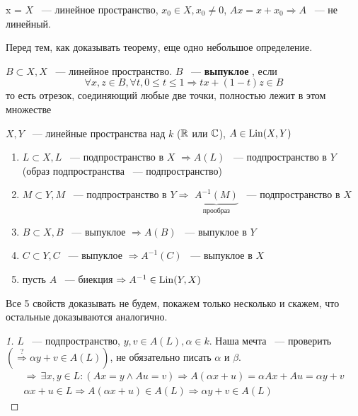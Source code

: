 \documentclass[document]{subfiles}
\begin{document}
\begin{example}x =
    $X$ ~--- линейное пространство, $x_0 \in X, x_0 \ne 0$, $Ax = x + x_0 \Rightarrow A$ ~--- не линейный.
\end{example}
 
Перед тем, как доказывать теорему, еще одно небольшое определение.
\begin{definition}
    $B \subset X, X$ ~--- линейное пространство. $B$ ~--- \textbf{ выпуклое }, если 
    \[ \forall x,z \in B, \forall t, 0 \leq t \leq 1 \Rightarrow tx + (1-t)z \in B \]
    то есть отрезок, соединяющий любые две точки, полностью лежит в этом множестве
\end{definition}
 
\begin{theorem}
    $X,Y$ ~--- линейные пространства над $k$ ($\mathbb{R}$ или $\mathbb{C}$), $A \in \operatorname{Lin}(X,Y)$
    \begin{enumerate}
        \item $L \subset X, L$ ~--- подпространство в $X$ $\Rightarrow A(L)$ ~--- подпространство в $Y$ (образ подпространства ~--- подпространство)
        \item $M \subset Y, M$ ~--- подпространство в $Y \Rightarrow$ $\underbrace{A^{-1}(M)}_{\text{прообраз}}$ ~--- подпространство в $X$
        \item $B \subset X, B$ ~--- выпуклое $\Rightarrow A(B)$ ~--- выпуклое в $Y$
        \item $C \subset Y, C$ ~--- выпуклое $\Rightarrow A^{-1}(C)$ ~--- выпуклое в $X$
        \item пусть $A$ ~--- биекция $\Rightarrow A^{-1} \in \operatorname{Lin}(Y,X)$
    \end{enumerate}
\end{theorem}
Все 5 свойств доказывать не будем, покажем только несколько и скажем, что остальные доказываются аналогично.
\begin{proof}[1]
    $L$ ~--- подпространство, $y,v \in A(L), \alpha \in k$. Наша мечта ~--- проверить $(\stackrel{?}{\Rightarrow} \alpha y + v \in A(L))$, не обязательно писать $\alpha$ и $\beta$.
    \begin{gather*}
        \Rightarrow \, \exists x,y \in L : (Ax = y \land Au = v) \Rightarrow A(\alpha x + u) = \alpha A x + A u = \alpha y + v \\
        \alpha x + u \in L \Rightarrow A(\alpha x + u) \in A(L) \Rightarrow \alpha y + v \in A(L)
    \end{gather*}
\end{proof}
 
\end{document}

